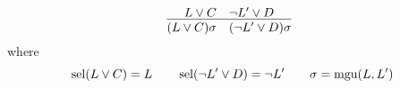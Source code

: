 

\[
	\infer
	[]
	{(L \lor C)\sigma\quad(\lnot L'\lor D)\sigma}
	{L \lor C& \lnot L'\lor D}
	\]
	where
	\[
		\operatorname{sel}(L\lor C) = L\qquad\operatorname{sel}(\lnot L'\lor D) = \lnot{L'}\qquad\sigma=\operatorname{mgu}(L,L')
	\]
